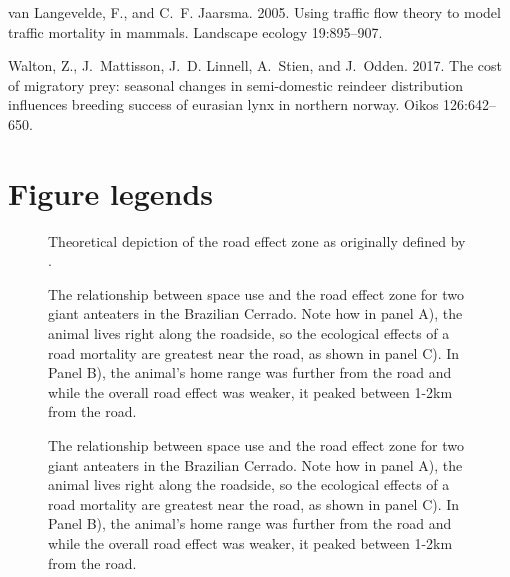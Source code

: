\documentclass[11pt]{article}
\begin{document}
\begin{thebibliography}{40}
van Langevelde, F., and C.~F. Jaarsma. 2005.
\newblock Using traffic flow theory to model traffic mortality in mammals.
\newblock Landscape ecology 19:895--907.

Walton, Z., J.~Mattisson, J.~D. Linnell, A.~Stien, and J.~Odden. 2017.
\newblock The cost of migratory prey: seasonal changes in semi-domestic
  reindeer distribution influences breeding success of eurasian lynx in
  northern norway.
\newblock Oikos 126:642--650.

\end{thebibliography}


\newpage{}

\section*{Figure legends}

\setcounter{figure}{0}


\begin{figure}[h!]
\caption{Theoretical depiction of the road effect zone as originally defined by \cite{Forman:1998}.}
\end{figure}

\begin{figure}[h!]
\caption{The relationship between space use and the road effect zone for two giant anteaters in the Brazilian Cerrado. Note how in panel A), the animal lives right along the roadside, so the ecological effects of a road mortality are greatest near the road, as shown in panel C). In Panel B), the animal's home range was further from the road and while the overall road effect was weaker, it peaked between 1-2km from the road.}
\end{figure}

\begin{figure}[h!]
\caption{The relationship between space use and the road effect zone for two giant anteaters in the Brazilian Cerrado. Note how in panel A), the animal lives right along the roadside, so the ecological effects of a road mortality are greatest near the road, as shown in panel C). In Panel B), the animal's home range was further from the road and while the overall road effect was weaker, it peaked between 1-2km from the road.}
\end{figure}
\end{document}
